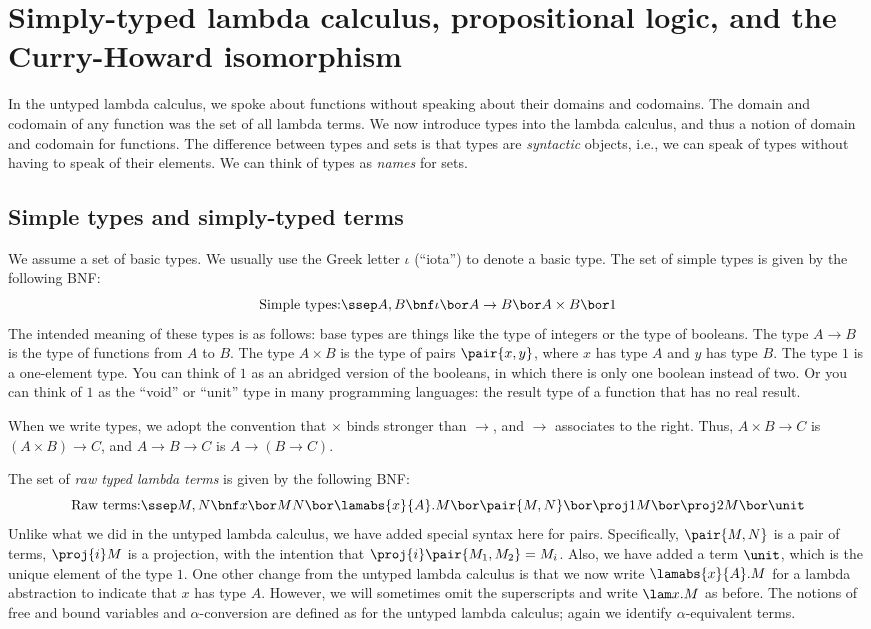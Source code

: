\documentclass[12pt]{article}
\begin{document}
\section{Simply-typed lambda calculus, propositional logic, and the Curry-Howard isomorphism}\label{sec-simply-typed-lc}

In the untyped lambda calculus, we spoke about functions without
speaking about their domains and codomains. The domain and codomain of
any function was the set of all lambda terms. We now introduce types
into the lambda calculus, and thus a notion of domain and codomain for
functions. The difference between types and sets is that types are
{\em syntactic} objects, i.e., we can speak of types without having to
speak of their elements. We can think of types as {\em names} for
sets.

\subsection{Simple types and simply-typed terms}

We assume a set of basic types. We usually use the Greek letter
$\iota$ (``iota'') to denote a basic type. The set of simple types is
given by the following BNF:
\[ \mbox{Simple types:}\ssep A,B \bnf \iota \bor A\to B\bor A\times
B\bor 1
\]
The intended meaning of these types is as follows: base types are
things like the type of integers or the type of booleans. The type $A\to
B$ is the type of functions from $A$ to $B$. The type $A\times B$ is
the type of pairs $\pair{x,y}$, where $x$ has type $A$ and $y$ has
type $B$. The type $1$ is a one-element type. You can think of $1$ as
an abridged version of the booleans, in which there is only one
boolean instead of two. Or you can think of $1$ as the ``void'' or
``unit'' type in many programming languages: the result type of a
function that has no real result.

When we write types, we adopt the convention that $\times$ binds
stronger than $\to$, and $\to$ associates to the right. Thus, $A\times
B\to C$ is $(A\times B)\to C$, and $A\to B\to C$ is $A\to (B\to C)$.

The set of {\em raw typed lambda terms} is given by the following BNF:
\[ \mbox{Raw terms:}\ssep M,N \bnf x \bor MN \bor \lamabs{x}{A}.M
\bor \pair{M,N} \bor \proj1 M \bor \proj2 M \bor \unit \] Unlike what
we did in the untyped lambda calculus, we have added special syntax
here for pairs. Specifically, $\pair{M,N}$ is a pair of terms,
$\proj{i} M$ is a projection, with the intention that
$\proj{i}\pair{M_1,M_2}=M_i$. Also, we have added a term $\unit$,
which is the unique element of the type $1$. One other change from the
untyped lambda calculus is that we now write $\lamabs{x}{A}.M$ for a
lambda abstraction to indicate that $x$ has type $A$. However, we will
sometimes omit the superscripts and write $\lam x.M$ as before. The
notions of free and bound variables and $\alpha$-conversion are
defined as for the untyped lambda calculus; again we identify
$\alpha$-equivalent terms.
\end{document}
